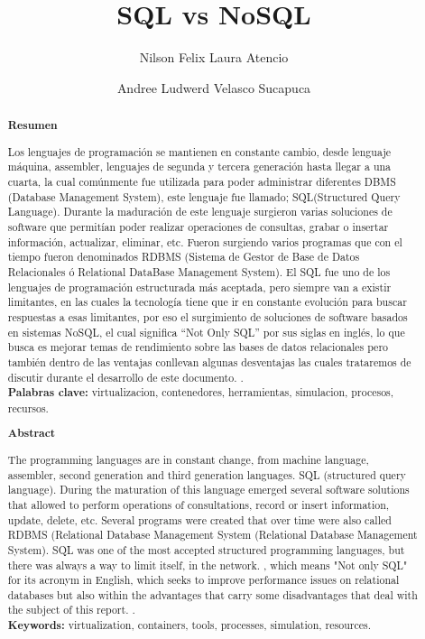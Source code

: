 \documentclass[%
 reprint,
 amsmath,amssymb,
 aps,
]{revtex4-1}
\begin{document}
\title{SQL vs NoSQL}
\author{Nilson Felix Laura Atencio}
\author{Andree Ludwerd Velasco Sucapuca}

%

\begin{abstract}
\begin{center}
\textbf{Resumen}
\end{center}

Los lenguajes de programación se mantienen en constante cambio, desde lenguaje máquina, assembler, lenguajes de segunda y tercera generación hasta llegar a una cuarta, la cual comúnmente fue utilizada para poder administrar diferentes DBMS (Database Management System), este lenguaje fue llamado; SQL(Structured Query Language). Durante la maduración de este lenguaje surgieron varias soluciones de software que permitían poder realizar operaciones de consultas, grabar o insertar información, actualizar, eliminar, etc. Fueron surgiendo varios programas que con el tiempo fueron denominados RDBMS (Sistema de Gestor de Base de Datos Relacionales ó Relational DataBase Management System).
El SQL fue uno de los lenguajes de programación estructurada más aceptada, pero siempre van a existir limitantes, en las cuales la tecnología tiene que ir en constante evolución para buscar respuestas a esas limitantes, por eso el surgimiento de soluciones de software basados en sistemas NoSQL, el cual significa “Not Only SQL” por sus siglas en inglés, lo que busca es mejorar temas de rendimiento sobre las bases de datos relacionales pero también dentro de las ventajas conllevan algunas desventajas las cuales trataremos de discutir durante el desarrollo de este documento.
.\\

\textbf{Palabras clave:}   virtualizacion, contenedores, herramientas, simulacion, procesos, recursos.\\

\begin{center}
\textbf{Abstract}
\end{center}
The programming languages are in constant change, from machine language, assembler, second generation and third generation languages. SQL (structured query language). During the maturation of this language emerged several software solutions that allowed to perform operations of consultations, record or insert information, update, delete, etc. Several programs were created that over time were also called RDBMS (Relational Database Management System (Relational Database Management System). SQL was one of the most accepted structured programming languages, but there was always a way to limit itself, in the network. , which means "Not only SQL" for its acronym in English, which seeks to improve performance issues on relational databases but also within the advantages that carry some disadvantages that deal with the subject of this report. .\\
\textbf{Keywords:}   virtualization, containers, tools, processes, simulation, resources.\\

\end{abstract}
\end{document}
